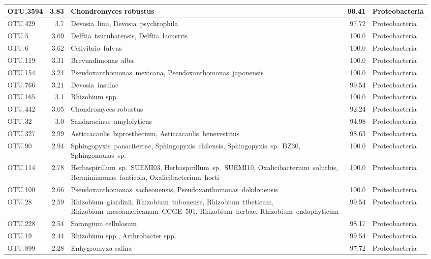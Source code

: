 \begin{longtable}{lrp{6.5cm}rl}
OTU.3594 & 3.83 & Chondromyces robustus & 90.41 & Proteobacteria \\ \midrule
OTU.429 & 3.7 & \mbox{Devosia limi}, \mbox{Devosia psychrophila} & 97.72 & Proteobacteria \\ \midrule
OTU.5 & 3.69 & \mbox{Delftia tsuruhatensis}, \mbox{Delftia lacustris} & 100.0 & Proteobacteria \\ \midrule
OTU.6 & 3.62 & \mbox{Cellvibrio fulvus} & 100.0 & Proteobacteria \\ \midrule
OTU.119 & 3.31 & \mbox{Brevundimonas alba} & 100.0 & Proteobacteria \\ \midrule
OTU.154 & 3.24 & \mbox{Pseudoxanthomonas mexicana}, \mbox{Pseudoxanthomonas japonensis} & 100.0 & Proteobacteria \\ \midrule
OTU.766 & 3.21 & \mbox{Devosia insulae} & 99.54 & Proteobacteria \\ \midrule
OTU.165 & 3.1 & Rhizobium spp. & 100.0 & Proteobacteria \\ \midrule
OTU.442 & 3.05 & Chondromyces robustus & 92.24 & Proteobacteria \\ \midrule
OTU.32 & 3.0 & \mbox{Sandaracinus amylolyticus} & 94.98 & Proteobacteria \\ \midrule
OTU.327 & 2.99 & \mbox{Asticcacaulis biprosthecium}, \mbox{Asticcacaulis benevestitus} & 98.63 & Proteobacteria \\ \midrule
OTU.90 & 2.94 & \mbox{Sphingopyxis panaciterrae}, \mbox{Sphingopyxis chilensis}, \mbox{Sphingopyxis sp. BZ30}, \mbox{Sphingomonas sp.} & 100.0 & Proteobacteria \\ \midrule
OTU.114 & 2.78 & \mbox{Herbaspirillum sp. SUEMI03}, \mbox{Herbaspirillum sp. SUEMI10}, \mbox{Oxalicibacterium solurbis}, \mbox{Herminiimonas fonticola}, \mbox{Oxalicibacterium horti} & 100.0 & Proteobacteria \\ \midrule
OTU.100 & 2.66 & \mbox{Pseudoxanthomonas sacheonensis}, \mbox{Pseudoxanthomonas dokdonensis} & 100.0 & Proteobacteria \\ \midrule
OTU.28 & 2.59 & \mbox{Rhizobium giardinii}, \mbox{Rhizobium tubonense}, \mbox{Rhizobium tibeticum}, \mbox{Rhizobium mesoamericanum CCGE 501}, \mbox{Rhizobium herbae}, \mbox{Rhizobium endophyticum} & 99.54 & Proteobacteria \\ \midrule
OTU.228 & 2.54 & Sorangium cellulosum & 98.17 & Proteobacteria \\ \midrule
OTU.19 & 2.44 & Rhizobium spp., Arthrobacter spp. & 99.54 & Proteobacteria \\ \midrule
OTU.899 & 2.28 & Enhygromyxa salina & 97.72 & Proteobacteria \\ \midrule

\end{longtable}
